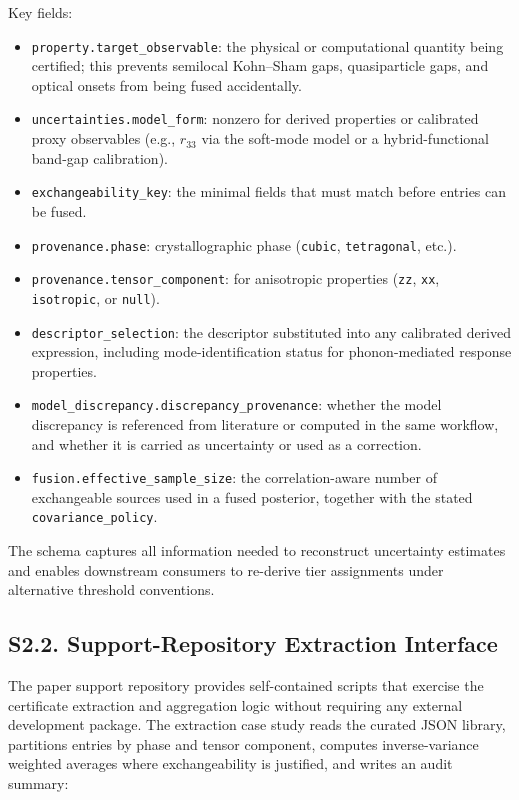 \documentclass[onecolumn,superscriptaddress,amsmath,amssymb,longbibliography]{revtex4-2}
\begin{document}
Key fields:
\begin{itemize}
    \item \texttt{property.target\_observable}: the physical or computational
    quantity being certified; this prevents semilocal Kohn--Sham gaps,
    quasiparticle gaps, and optical onsets from being fused accidentally.
    \item \texttt{uncertainties.model\_form}: nonzero for derived properties
    or calibrated proxy observables (e.g., $r_{33}$ via the soft-mode model or
    a hybrid-functional band-gap calibration).
    \item \texttt{exchangeability\_key}: the minimal fields that must match
    before entries can be fused.
    \item \texttt{provenance.phase}: crystallographic phase
    (\texttt{cubic}, \texttt{tetragonal}, etc.).
    \item \texttt{provenance.tensor\_component}: for anisotropic properties
    (\texttt{zz}, \texttt{xx}, \texttt{isotropic}, or \texttt{null}).
    \item \texttt{descriptor\_selection}: the descriptor substituted into any
    calibrated derived expression, including mode-identification status for
    phonon-mediated response properties.
    \item \texttt{model\_discrepancy.discrepancy\_provenance}: whether the
    model discrepancy is referenced from literature or computed in the same
    workflow, and whether it is carried as uncertainty or used as a correction.
    \item \texttt{fusion.effective\_sample\_size}: the correlation-aware
    number of exchangeable sources used in a fused posterior, together with
    the stated \texttt{covariance\_policy}.
\end{itemize}

The schema captures all information needed to reconstruct uncertainty
estimates and enables downstream consumers to re-derive tier assignments
under alternative threshold conventions.


\subsection{S2.2. Support-Repository Extraction Interface}

The paper support repository provides self-contained scripts that exercise the
certificate extraction and aggregation logic without requiring any external
development package. The extraction case study reads the curated JSON library,
partitions entries by phase and tensor component, computes inverse-variance
weighted averages where exchangeability is justified, and writes an audit
summary:
\end{document}
